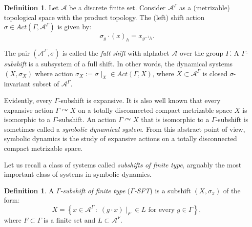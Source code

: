 \documentclass[oneside,english]{amsart}
\theoremstyle{definition}
\newtheorem{defn}[thm]{Definition}
\newcommand{\AAA}{\mathcal{A}}
\newcommand{\act}[2]{{#1} \curvearrowright {#2}}
\newcommand{\Act}[2]{\mathit{Act}({#1},{#2})}
\begin{document}
\begin{defn}
Let $\AAA$ be a discrete finite set. Consider $\AAA^\Gamma$ as a (metrizable) topological space with the product topology.
The (left) shift action $\sigma \in \Act{\Gamma}{\AAA^\Gamma}$ is given by: %
\begin{equation}
\sigma_g \cdot (x)_h = x_{g^{-1}h}.
\end{equation}


The pair $(\AAA^\Gamma,\sigma)$ is called  the \emph{full shift} with alphabet $\AAA$ over the group $\Gamma$.
A \emph{$\Gamma$-subshift} is a subsystem of a full shift. In other words, the dynamical systems $(X,\sigma_X)$ where action $\sigma_X := \sigma \mid_X \in \Act{\Gamma}{X}$,
 where $X \subset \AAA^\Gamma$ is closed $\sigma$-invariant subset of $\AAA^\Gamma$.
\end{defn}

Evidently, every $\Gamma$-subshift is expansive. It is also well known that  every expansive action $\act{\Gamma}{X}$ on a totally disconnected compact metrizable space $X$ is isomorphic to a $\Gamma$-subshift. An action  $\act{\Gamma}{X}$ that is isomorphic to a $\Gamma$-subshift is sometimes called a \emph{symbolic dynamical system}. From this abstract point of view, symbolic dynamics is the study of expansive actions on a totally disconnected compact metrizable space.

 Let us recall a class of systems called \emph{subshifts of finite type},
arguably the most important class of systems in symbolic dynamics.  %
\begin{defn}\label{def:SFT}
 A \emph{$\Gamma$-subshift of finite type} (\emph{$\Gamma$-SFT}) is a subshift $(X,\sigma_x)$ of the  form: %
\begin{equation}\label{eq:SFT}
X = \left\{x \in \AAA^\Gamma~:~ (g \cdot x)\mid_F \in L \mbox{ for every } g \in \Gamma \right\},
\end{equation}
where  $F \subset \Gamma$ is a finite set and $L \subset \AAA^F$.
\end{defn}
\end{document}
